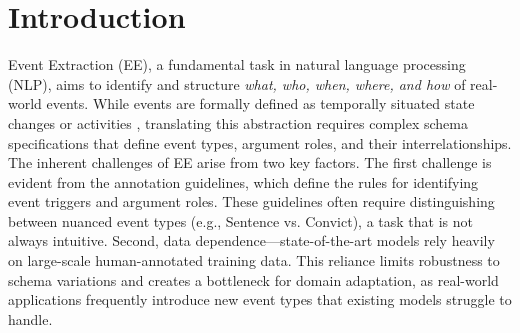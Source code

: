 \section{Introduction}


Event Extraction (EE), a fundamental task in natural language processing (NLP), aims to identify and structure \textit{what, who, when, where, and how} of real-world events. While events are formally defined as temporally situated state changes or activities \citep{doddington-etal-2004-automatic}, translating this abstraction requires complex schema specifications that define event types, argument roles, and their interrelationships. The inherent challenges of EE arise from two key factors. The first challenge is evident from the annotation guidelines, which define the rules for identifying event triggers and argument roles. These guidelines often require distinguishing between nuanced event types (e.g., Sentence vs. Convict), a task that is not always intuitive. Second, data dependence—state-of-the-art models rely heavily on large-scale human-annotated training data. This reliance limits robustness to schema variations and creates a bottleneck for domain adaptation, as real-world applications frequently introduce new event types that existing models struggle to handle. 


